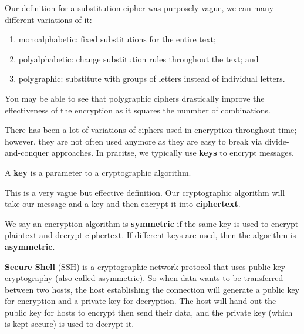 \begin{example}
    Our definition for a substitution cipher was purposely vague, we can many different variations of it:
    \begin{enumerate}
        \item monoalphabetic: fixed substitutions for the entire text;
        \item polyalphabetic: change substitution rules throughout the text; and
        \item polygraphic: substitute with groups of letters instead of individual letters.
    \end{enumerate}
    You may be able to see that polygraphic ciphers drastically improve the effectiveness of the encryption as it squares the nunmber of combinations. 
\end{example}

\begin{remark}
    There has been a lot of variations of ciphers used in encryption throughout time; however, they are not often used anymore as they are easy to break via divide-and-conquer approaches. In pracitse, we typically use \textbf{keys} to encrypt messages.
\end{remark}

\begin{definition}[Key]
    A \textbf{key} is a parameter to a cryptographic algorithm.
\end{definition}

This is a very vague but effective definition. Our cryptographic algorithm will take our message and a key and then encrypt it into \textbf{ciphertext}.

\begin{definition}
    We say an encryption algorithm is \textbf{symmetric} if the same key is used to encrypt plaintext and decrypt ciphertext. If different keys are used, then the algorithm is \textbf{asymmetric}.
\end{definition}

\begin{example}[SSH]
    \textbf{Secure Shell} (SSH) is a cryptographic network protocol that uses public-key cryptography (also called asymmetric). So when data wants to be transferred between two hosts, the host establishing the connection will generate a public key for encryption and a private key for decryption. The host will hand out the public key for hosts to encrypt then send their data, and the private key (which is kept secure) is used to decrypt it.
\end{example}


